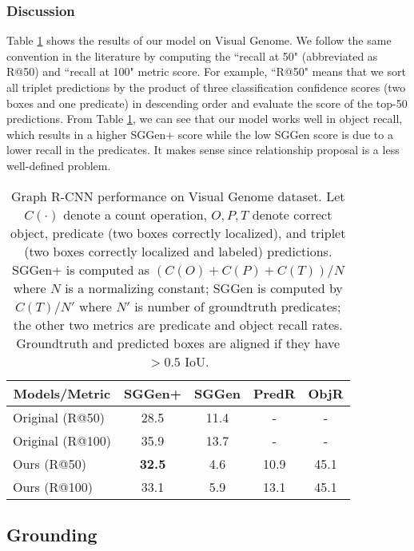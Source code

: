 \subsubsection{Discussion}
Table \ref{tab: sggen} shows the results of our model on Visual Genome. We follow the same convention in the literature by computing the ``recall at 50" (abbreviated as R@50) and ``recall at 100" metric score. For example, ``R@50" means that we sort all triplet predictions by the product of three classification confidence scores (two boxes and one predicate) in descending order and evaluate the score of the top-50 predictions. From Table \ref{tab: sggen}, we can see that our model works well in object recall, which results in a higher SGGen+ score while the low SGGen score is due to a lower recall in the predicates. It makes sense since relationship proposal is a less well-defined problem. 

\begin{table}[]
\begin{tabular}{|l|c|c|c|c|}
\hline
\multicolumn{1}{|c|}{Models/Metric} & SGGen+        & SGGen & PredR & ObjR \\ \hline
Original (R@50)                     & 28.5          & 11.4  & -     & -    \\ \hline
Original (R@100)                    & 35.9          & 13.7  & -     & -    \\ \hline
Ours (R@50)                         & \textbf{32.5} & 4.6   & 10.9  & 45.1 \\ \hline
Ours (R@100)                        & 33.1          & 5.9   & 13.1  & 45.1 \\ \hline
\end{tabular}
\caption{Graph R-CNN performance on Visual Genome dataset. Let $C(\cdot)$ denote a count operation, $O, P, T$ denote correct object, predicate (two boxes correctly localized), and triplet (two boxes correctly localized and labeled) predictions. SGGen+ is computed as $(C(O)+ C(P)+C(T))/N$ where $N$ is a normalizing constant; SGGen is computed by $C(T)/N'$ where $N'$ is number of groundtruth predicates; the other two metrics are predicate and object recall rates. Groundtruth and predicted boxes are aligned if they have $>0.5$ IoU.}
\label{tab: sggen}
\end{table}

\subsection{Grounding}
